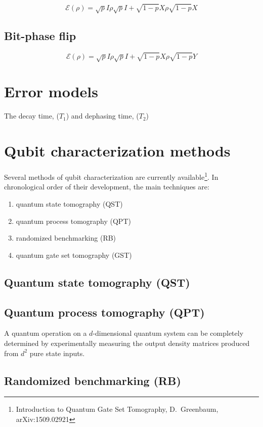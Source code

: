 \documentclass[11pt, oneside]{article}   	%
\begin{document}
\begin{equation}
\mathcal{E} (\rho) = \sqrt{p} I \rho  \sqrt{p} I + \sqrt{1-p} X  \rho \sqrt{1-p} X 
\end{equation}

\subsection{Bit-phase flip}
\begin{equation}
\mathcal{E} (\rho) = \sqrt{p} I \rho  \sqrt{p} I + \sqrt{1-p} X  \rho \sqrt{1-p} Y
\end{equation}

\section{Error models}
The decay time,  ($T_1$) and dephasing time,  ($T_2$) 

\section{Qubit characterization methods}
Several methods of qubit characterization are currently available\footnote{Introduction to Quantum Gate Set Tomography, D.~Greenbaum, arXiv:1509.02921}. 
In chronological order of their development, the main techniques are:
\begin{enumerate}
\item quantum state tomography (QST)
\item quantum process tomography (QPT)
\item randomized benchmarking (RB)
\item quantum gate set tomography (GST)
\end{enumerate}

\subsection{Quantum state tomography (QST)}

\subsection{Quantum process tomography (QPT)}
A quantum operation on a $d$-dimensional quantum system can be completely determined by experimentally measuring the output density matrices produced from $d^2$ pure state inputs.

\subsection{Randomized benchmarking (RB)}
\end{document}

